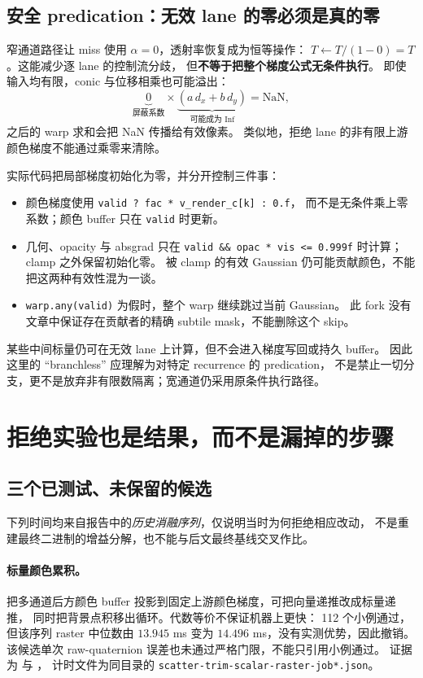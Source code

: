 \subsection{安全 predication：无效 lane 的零必须是真的零}

窄通道路径让 miss 使用 \(\alpha=0\)，透射率恢复成为恒等操作：
\(T\leftarrow T/(1-0)=T\)。这能减少逐 lane 的控制流分歧，
但\textbf{不等于把整个梯度公式无条件执行}。
即使输入均有限，conic 与位移相乘也可能溢出：
\[
 \underbrace{0}_{\text{屏蔽系数}}\times
 \underbrace{(a\,d_x+b\,d_y)}_{\text{可能成为 Inf}}
 =\mathrm{NaN},
\]
之后的 warp 求和会把 NaN 传播给有效像素。
类似地，拒绝 lane 的非有限上游颜色梯度不能通过乘零来清除。

实际代码把局部梯度初始化为零，并分开控制三件事：
\begin{itemize}
 \item 颜色梯度使用 \texttt{valid ? fac * v\_render\_c[k] : 0.f}，
 而不是无条件乘上零系数；颜色 buffer 只在 \texttt{valid} 时更新。
 \item 几何、opacity 与 absgrad 只在
 \texttt{valid \&\& opac * vis <= 0.999f} 时计算；clamp 之外保留初始化零。
 被 clamp 的有效 Gaussian 仍可能贡献颜色，不能把这两种有效性混为一谈。
 \item \texttt{warp.any(valid)} 为假时，整个 warp 继续跳过当前 Gaussian。
 此 fork 没有文章中保证存在贡献者的精确 subtile mask，不能删除这个 skip。
\end{itemize}
某些中间标量仍可在无效 lane 上计算，但不会进入梯度写回或持久 buffer。
因此这里的 ``branchless'' 应理解为对特定 recurrence 的 predication，
不是禁止一切分支，更不是放弃非有限数隔离；宽通道仍采用原条件执行路径。

\section{拒绝实验也是结果，而不是漏掉的步骤}

\subsection{三个已测试、未保留的候选}

下列时间均来自报告中的\emph{历史消融序列}，仅说明当时为何拒绝相应改动，
不是重建最终二进制的增益分解，也不能与后文最终基线交叉作比。

\paragraph{标量颜色累积。}
把多通道后方颜色 buffer 投影到固定上游颜色梯度，可把向量递推改成标量递推，
同时把背景点积移出循环。代数等价不保证机器上更快：
112 个小例通过，但该序列 raster 中位数由 \(13.945\) ms 变为
\(14.496\) ms，没有实测优势，因此撤销。
该候选单次 raw-quaternion 误差也未通过严格门限，不能只引用小例通过。
证据为 
与 ，
计时文件为同目录的 \texttt{scatter-trim-scalar-raster-job*.json}。

